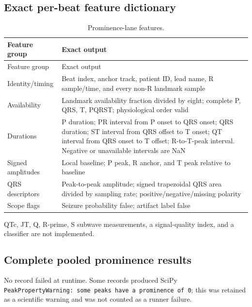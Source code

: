 \documentclass[11pt,a4paper]{article}
\begin{document}
\subsection{Exact per-beat feature dictionary}

\begin{longtable}{p{}p{}}
\caption{Prominence-lane features.}\\
\toprule
Feature group & Exact output \\
\midrule
\endfirsthead
\toprule
Feature group & Exact output \\
\midrule
\endhead
Identity/timing & Beat index, anchor track, patient ID, lead name, R sample/time, and every non-R landmark sample \\
Availability & Landmark availability fraction divided by eight; complete P, QRS, T, PQRST; physiological order valid \\
Durations & P duration; PR interval from P onset to QRS onset; QRS duration; ST interval from QRS offset to T onset; QT interval from QRS onset to T offset; R-to-T-peak interval. Negative or unavailable intervals are NaN \\
Signed amplitudes & Local baseline; P peak, R anchor, and T peak relative to baseline \\
QRS descriptors & Peak-to-peak amplitude; signed trapezoidal QRS area divided by sampling rate; positive/negative/missing polarity \\
Scope flags & Seizure probability false; artifact label false \\
\bottomrule
\end{longtable}

QTc, JT, Q, R-prime, S subwave measurements, a signal-quality index, and a classifier are not implemented.

\subsection{Complete pooled prominence results}

No record failed at runtime. Some records produced SciPy \texttt{PeakPropertyWarning: some peaks have a prominence of 0}; this was retained as a scientific warning and was not counted as a runner failure.
\end{document}

